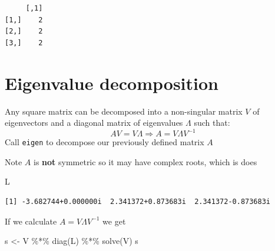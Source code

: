 \documentclass[
  letterpaper,
]{book}
\newenvironment{Shaded}{\begin{snugshade}}{\end{snugshade}}
\newcommand{\CommentTok}[1]{\textcolor[rgb]{0.37,0.37,0.37}{#1}}
\newcommand{\FunctionTok}[1]{\textcolor[rgb]{0.28,0.35,0.67}{#1}}
\newcommand{\NormalTok}[1]{\textcolor[rgb]{0.00,0.23,0.31}{#1}}
\newcommand{\OtherTok}[1]{\textcolor[rgb]{0.00,0.23,0.31}{#1}}
\newcommand{\SpecialCharTok}[1]{\textcolor[rgb]{0.37,0.37,0.37}{#1}}
\begin{document}
\begin{verbatim}
     [,1]
[1,]    2
[2,]    2
[3,]    2
\end{verbatim}

\hypertarget{eigenvalue-decomposition}{%
\section{Eigenvalue decomposition}\label{eigenvalue-decomposition}}

Any square matrix can be decomposed into a non-singular matrix \(V\) of
eigenvectors and a diagonal matrix of eigenvalues \(\Lambda\) such that:
\begin{equation}
  A V = V \Lambda \Rightarrow A = V\Lambda V^{-1}
\end{equation} Call \texttt{eigen} to decompose our previously defined
matrix \(A\)

\begin{Shaded}
\end{Shaded}

Note \(A\) is \textbf{not} symmetric so it may have complex roots, which
is does

\begin{Shaded}
\begin{Highlighting}[]
\NormalTok{L}
\end{Highlighting}
\end{Shaded}

\begin{verbatim}
[1] -3.682744+0.000000i  2.341372+0.873683i  2.341372-0.873683i
\end{verbatim}

If we calculate \(A = V\Lambda V^{-1}\) we get

\begin{Shaded}
\begin{Highlighting}[]
\NormalTok{s }\OtherTok{\textless{}{-}}\NormalTok{ V }\SpecialCharTok{\%*\%} \FunctionTok{diag}\NormalTok{(L) }\SpecialCharTok{\%*\%} \FunctionTok{solve}\NormalTok{(V)}
\NormalTok{s}
\end{Highlighting}
\end{Shaded}
\end{document}

